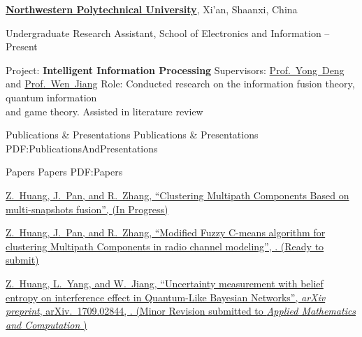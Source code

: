 \documentclass[letterpaper,MMMyyyy,nonstopmode]{simpleresumecv}
\begin{document}
\begin{Body}
\begin{Detail}
\end{Detail}

\Entry
\href{http://en.nwpu.edu.cn/}
{\textbf{Northwestern Polytechnical University}},
Xi'an, Shaanxi, China

\Gap
\BulletItem
Undergraduate Research Assistant, School of Electronics and Information
\hfill
{} --
Present
\begin{Detail}
\SubBulletItem
Project:
\textbf{Intelligent Information Processing}
\SubBulletItem
Supervisors:
\href{https://scholar.google.com/citations?user=8voeILsAAAAJ}
{Prof.~Yong~Deng} and
\href{http://teacher.nwpu.edu.cn/jiangwen.html}
{Prof.~Wen~Jiang}
\SubBulletItem
Role:
Conducted research on the information fusion theory, quantum information \\ and game theory. Assisted in literature review

\end{Detail}

\Section
{Publications \&\newline
Presentations}
{Publications \& Presentations}
{PDF:PublicationsAndPresentations}

\SubSection
{Papers}
{Papers}
{PDF:Papers}

\begingroup
\renewcommand{\MaxNumberedItem}{[88]}


\Gap
\NumberedItem{[2]}
\href{https://arxiv.org/abs/1709.02844}
{\underline{Z.~Huang}, J.~Pan, and R.~Zhang,
``Clustering Multipath Components Based on multi-snapshots fusion'',
(In Progress)}

\Gap
\NumberedItem{[3]}
\href{https://arxiv.org/abs/1709.02844}
{\underline{Z.~Huang}, J.~Pan, and R.~Zhang,
``Modified Fuzzy C-means algorithm for clustering Multipath Components in radio channel modeling'',
. (Ready to submit)}

\Gap
\NumberedItem{[4]}
\href{https://arxiv.org/abs/1709.02844}
{\underline{Z.~Huang}, L.~Yang, and W.~Jiang,
``Uncertainty measurement with belief entropy on interference effect in Quantum-Like Bayesian Networks'',
\textit{arXiv preprint},
arXiv.~1709.02844,
. (Minor Revision submitted to \textit{Applied Mathematics and Computation} )}


\end{Body}
\end{document}
